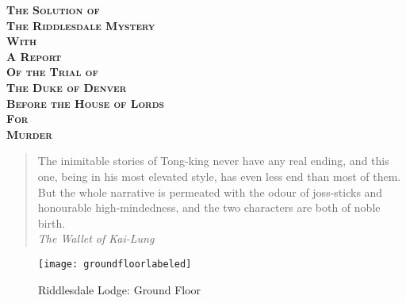 \documentclass[
a5paper,
]{scrbook} %
\begin{document}
\setlength{\epigraphwidth}{0.8\textwidth}
\renewcommand{\epigraphflush}{center}
\renewcommand{\sourceflush}{center}


\frontmatter
\pagestyle{empty}





\begin{center}\scshape\bfseries
{\Large The Solution of}\\
{\Large The Riddlesdale Mystery}\\

{\Large With}\\

{\Large A Report}\\

{\Large Of the Trial of}\\

{\Large The Duke of Denver}\\

{\Large Before the House of Lords}\\

{\Large For}\\

{\Large Murder}\\
\end{center}
\vfill
\begin{quote}
The inimitable stories of Tong-king never have any real ending, and this one, being in his most elevated style, has even less end than most of them. But the whole narrative is permeated with the odour of joss-sticks and honourable high-mindedness, and the two characters are both of noble birth.\\

\textit{The Wallet of Kai-Lung}
\end{quote}
\clearpage
\renewcommand*{\chapterheadendvskip}{\vspace{10pt}}
\renewcommand*{\chapterheadstartvskip}{\vspace{0pt}}

\tableofcontents

\clearpage


\begin{sidewaysfigure}
\centering
\texttt{[image: groundfloorlabeled]}%
\caption{Riddlesdale Lodge: Ground Floor}
\end{sidewaysfigure}
\end{document}

